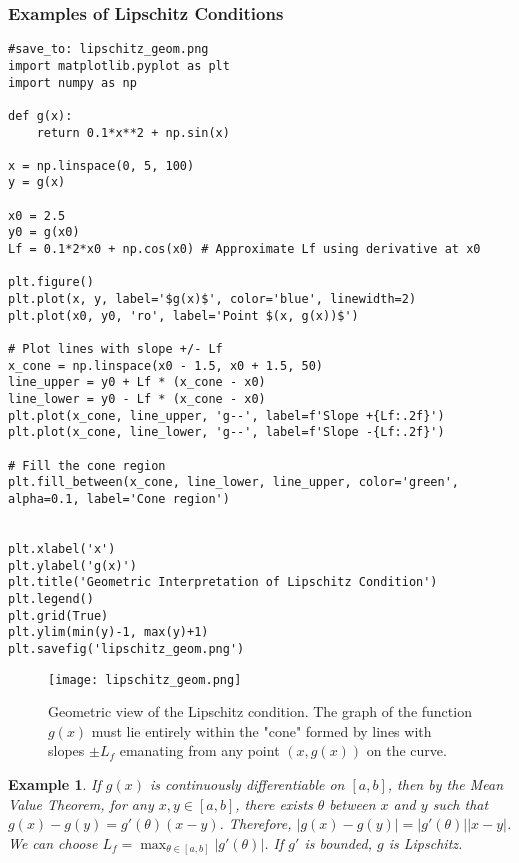 \documentclass{article}
\newtheorem{example}{Example}
\begin{document}
\subsubsection{Examples of Lipschitz Conditions}

\begin{verbatim}
#save_to: lipschitz_geom.png
import matplotlib.pyplot as plt
import numpy as np

def g(x):
    return 0.1*x**2 + np.sin(x)

x = np.linspace(0, 5, 100)
y = g(x)

x0 = 2.5
y0 = g(x0)
Lf = 0.1*2*x0 + np.cos(x0) # Approximate Lf using derivative at x0

plt.figure()
plt.plot(x, y, label='$g(x)$', color='blue', linewidth=2)
plt.plot(x0, y0, 'ro', label='Point $(x, g(x))$')

# Plot lines with slope +/- Lf
x_cone = np.linspace(x0 - 1.5, x0 + 1.5, 50)
line_upper = y0 + Lf * (x_cone - x0)
line_lower = y0 - Lf * (x_cone - x0)
plt.plot(x_cone, line_upper, 'g--', label=f'Slope +{Lf:.2f}')
plt.plot(x_cone, line_lower, 'g--', label=f'Slope -{Lf:.2f}')

# Fill the cone region
plt.fill_between(x_cone, line_lower, line_upper, color='green', alpha=0.1, label='Cone region')


plt.xlabel('x')
plt.ylabel('g(x)')
plt.title('Geometric Interpretation of Lipschitz Condition')
plt.legend()
plt.grid(True)
plt.ylim(min(y)-1, max(y)+1)
plt.savefig('lipschitz_geom.png')
\end{verbatim}

\begin{figure}[h]
    \centering
    \texttt{[image: lipschitz\_geom.png]}
    \caption{Geometric view of the Lipschitz condition. The graph of the function $g(x)$ must lie entirely within the "cone" formed by lines with slopes $\pm L_f$ emanating from any point $(x, g(x))$ on the curve.}
    \label{fig:lipschitz_geom}
\end{figure}

\begin{example}
If $g(x)$ is continuously differentiable on $[a, b]$, then by the Mean Value Theorem, for any $x, y \in [a, b]$, there exists $\theta$ between $x$ and $y$ such that $g(x) - g(y) = g'(\theta)(x-y)$. Therefore, $|g(x) - g(y)| = |g'(\theta)| |x-y|$. We can choose $L_f = \max_{\theta \in [a, b]} |g'(\theta)|$. If $g'$ is bounded, $g$ is Lipschitz.
\end{example}
\end{document}
